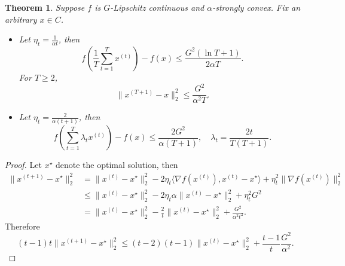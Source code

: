 \documentclass[openany]{book}
\newtheorem{theorem}{Theorem}[chapter]
\theoremstyle{definition}
\theoremstyle{remark}
\newtheorem*{remark}{Remark}
\begin{document}
\begin{theorem}\label{thm:GDStrConvBound}
    Suppose $f$ is $G$-Lipschitz continuous and $\alpha$-strongly convex. Fix an arbitrary $x\in C$.
    \begin{itemize}
        \item Let $\eta_t=\frac{1}{\alpha t}$, then
        \begin{equation*}
            f\left(\frac{1}{T}\sum_{t=1}^{T}x^{(t)}\right)-f(x)\le \frac{G^2(\ln T+1)}{2\alpha T}.
        \end{equation*}
        For $T\ge2$,
        \begin{equation*}
            \|x^{(T+1)}-x\|_2^2\le \frac{G^2}{\alpha^2T}.
        \end{equation*}

        \item Let $\eta_t=\frac{2}{\alpha(t+1)}$, then
        \begin{equation}
            f\left(\sum_{t=1}^{T}\lambda_tx^{(t)}\right)-f(x)\le \frac{2G^2}{\alpha(T+1)},\quad \lambda_t=\frac{2t}{T(T+1)}.
        \end{equation}
    \end{itemize}
\end{theorem}
\begin{proof}
    Let $x^{\star}$ denote the optimal solution, then
    \begin{align*}
        \|x^{(t+1)}-x^{\star}\|_2^2 & =\|x^{(t)}-x^{\star}\|_2^2-2\eta_t \langle\nabla f(x^{(t)}),x^{(t)}-x^{\star}\rangle+\eta_t^2\|\nabla f(x^{(t)})\|_2^2 \\
         & \le\|x^{(t)}-x^{\star}\|_2^2-2\eta_t\alpha\|x^{(t)}-x^{\star}\|_2^2+\eta_t^2G^2 \\
         & =\|x^{(t)}-x^{\star}\|_2^2-\frac{2}{t}\|x^{(t)}-x^{\star}\|_2^2+\frac{G^2}{\alpha^2t^2}.
    \end{align*}
    Therefore
    \begin{equation*}
        (t-1)t\|x^{(t+1)}-x^{\star}\|_2^2\le(t-2)(t-1)\|x^{(t)}-x^{\star}\|_2^2+\frac{t-1}{t}\frac{G^2}{\alpha^2}.
    \end{equation*}
\end{proof}

\begin{comment}
\begin{remark}
    As in the non-strongly-convex case, \Cref{thm:GDStrConvBound} works in the online (when making sense) or stochastic case. It is also possible to get some bound for the last iterate; see \cite{SZ13}.
\end{remark}
\begin{remark}
    Both step sizes cannot tolerate noise added to $g(x^{(t)})$ or $x^{(t)}$.
\end{remark}
\end{comment}
\end{document}
